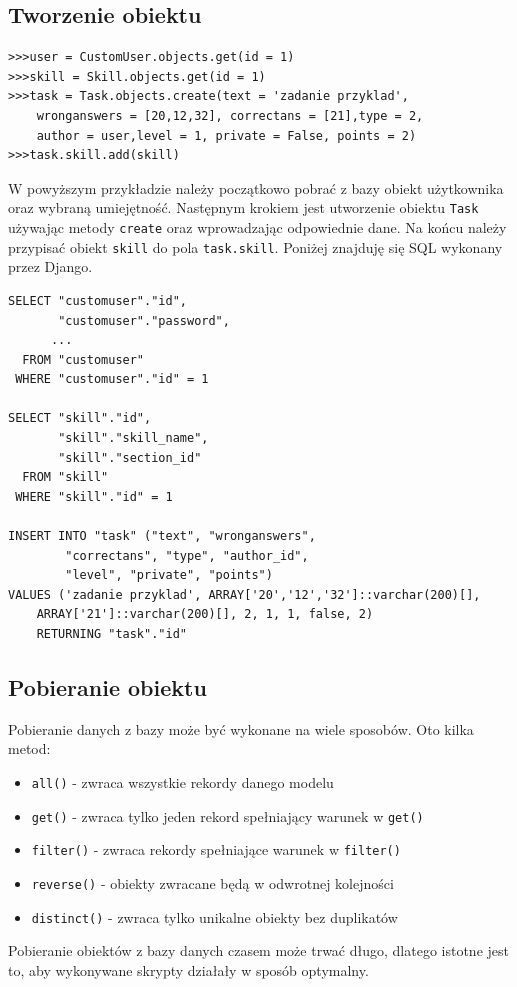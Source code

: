 \documentclass[oneside,polski,logo,indent]{amuthesis}
\begin{document}
\begin{enumerate}
\begin{enumerate}
\subsection{Tworzenie obiektu}
\begin{lstlisting}[style=DOS]
>>>user = CustomUser.objects.get(id = 1)
>>>skill = Skill.objects.get(id = 1)
>>>task = Task.objects.create(text = 'zadanie przyklad',
	wronganswers = [20,12,32], correctans = [21],type = 2,
	author = user,level = 1, private = False, points = 2)
>>>task.skill.add(skill)

\end{lstlisting}
W powyższym przykładzie należy początkowo pobrać z bazy obiekt użytkownika oraz wybraną umiejętność. Następnym krokiem jest utworzenie obiektu \texttt{Task} używając metody \texttt{create} oraz wprowadzając odpowiednie dane. Na końcu należy przypisać obiekt \texttt{skill} do pola \texttt{task.skill}. Poniżej znajduję się SQL wykonany przez Django.
\begin{lstlisting}[style=DOS]
SELECT "customuser"."id",
       "customuser"."password",
	  ...
  FROM "customuser"
 WHERE "customuser"."id" = 1

SELECT "skill"."id",
       "skill"."skill_name",
       "skill"."section_id"
  FROM "skill"
 WHERE "skill"."id" = 1

INSERT INTO "task" ("text", "wronganswers",
		"correctans", "type", "author_id",
		"level", "private", "points")
VALUES ('zadanie przyklad', ARRAY['20','12','32']::varchar(200)[],
	ARRAY['21']::varchar(200)[], 2, 1, 1, false, 2) 
	RETURNING "task"."id"
\end{lstlisting}
\subsection{Pobieranie obiektu}
Pobieranie danych z bazy może być wykonane na wiele sposobów. Oto kilka metod:
\begin{itemize}
\item \texttt{all()} - zwraca wszystkie rekordy danego modelu
\item \texttt{get()} - zwraca tylko jeden rekord spełniający warunek w \texttt{get()}
\item \texttt{filter()} - zwraca rekordy spełniające warunek w \texttt{filter()}
\item \texttt{reverse()} - obiekty zwracane będą w odwrotnej kolejności
\item \texttt{distinct()} - zwraca tylko unikalne obiekty bez duplikatów
\end{itemize}
Pobieranie obiektów z bazy danych czasem może trwać długo, dlatego istotne jest to, aby wykonywane skrypty działały w sposób optymalny. 


\end{enumerate}
\end{enumerate}
\end{document}
